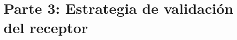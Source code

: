 \documentclass[11pt,a4paper]{article}
\begin{document}
\section{Parte 3: Estrategia de validación del receptor}
\end{document}
